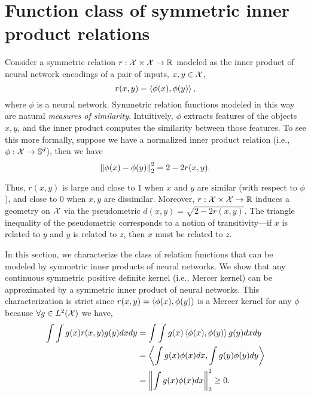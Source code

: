 \section{Function class of symmetric inner product relations}\label{sec:symmetric_relations}

Consider a symmetric relation $r: {\mathcal{X}} \times {\mathcal{X}} \to \mathbb{R}$ modeled as the inner product of neural network encodings of a pair of inputs, $x, y \in {\mathcal{X}}$,
\begin{equation}\label{eq:symmetric_iprod_relation}
    r(x, y) = \iprod{\phi(x)}{\phi(y)},
\end{equation}
where $\phi$ is a neural network. Symmetric relation functions modeled in this way are natural \textit{measures of similarity}. Intuitively, $\phi$ extracts features of the objects $x,y$, and the inner product computes the similarity between those features. To see this more formally, suppose we have a normalized inner product relation (i.e., $\phi: {\mathcal{X}} \to {\mathbb{S}}^{d}$), then we have
\begin{equation}
    \left\lVert\phi(x) - \phi(y)\right\rVert_{2}^2 = 2 - 2 r(x, y).
\end{equation}


Thus, $r(x,y)$ is large and close to $1$ when $x$ and $y$ are similar (with respect to $\phi$), and close to $0$ when $x, y$ are dissimilar. Moreover, $r: {\mathcal{X}} \times {\mathcal{X}} \to \mathbb{R}$ induces a geometry on ${\mathcal{X}}$ via the pseudometric $d(x,y) = \sqrt{2 - 2 r(x,y)}$. The triangle inequality of the pseudometric corresponds to a notion of transitivity---if $x$ is related to $y$ and $y$ is related to $z$, then $x$ must be related to $z$.

In this section, we characterize the class of relation functions that can be modeled by symmetric inner products of neural networks. We show that any continuous symmetric positive definite kernel (i.e., Mercer kernel) can be approximated by a symmetric inner product of neural networks. This characterization is strict since $r(x,y) = \left \langle \phi(x), \phi(y) \right\rangle$ is a Mercer kernel for any $\phi$ because $\forall g \in L^2({\mathcal{X}})$ we have,
\begin{equation*}
    \begin{split}
        \int \int g(x) r(x,y) g(y) dx dy &= \int \int g(x) \left \langle \phi(x), \phi(y) \right\rangle g(y) dx dy \\
        &= \left \langle \int g(x) \phi(x) dx, \int g(y) \phi(y) dy \right\rangle \\
        &= \left\lVert\int g(x) \phi(x) dx\right\rVert_{2}^2 \geq 0.
    \end{split}
\end{equation*}

